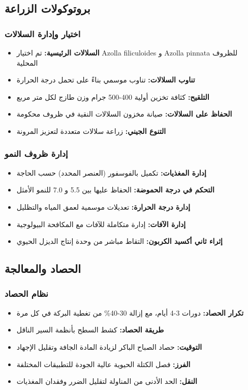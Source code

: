 \subsection{بروتوكولات الزراعة}

\subsubsection{اختيار وإدارة السلالات}
\begin{itemize}
    \item \textbf{السلالات الرئيسية:} تم اختيار Azolla filiculoides و Azolla pinnata للظروف المحلية
    \item \textbf{تناوب السلالات:} تناوب موسمي بناءً على تحمل درجة الحرارة
    \item \textbf{التلقيح:} كثافة تخزين أولية 400-500 جرام وزن طازج لكل متر مربع
    \item \textbf{الحفاظ على السلالات:} صيانة مخزون السلالات النقية في ظروف محكومة
    \item \textbf{التنوع الجيني:} زراعة سلالات متعددة لتعزيز المرونة
\end{itemize}

\subsubsection{إدارة ظروف النمو}
\begin{itemize}
    \item \textbf{إدارة المغذيات:} تكميل بالفوسفور (العنصر المحدد) حسب الحاجة
    \item \textbf{التحكم في درجة الحموضة:} الحفاظ عليها بين 5.5 و 7.0 للنمو الأمثل
    \item \textbf{إدارة درجة الحرارة:} تعديلات موسمية لعمق المياه والتظليل
    \item \textbf{إدارة الآفات:} إدارة متكاملة للآفات مع المكافحة البيولوجية
    \item \textbf{إثراء ثاني أكسيد الكربون:} التقاط مباشر من وحدة إنتاج الديزل الحيوي
\end{itemize}

\subsection{الحصاد والمعالجة}

\subsubsection{نظام الحصاد}
\begin{itemize}
    \item \textbf{تكرار الحصاد:} دورات 3-4 أيام، مع إزالة 30-40\% من تغطية البركة في كل مرة
    \item \textbf{طريقة الحصاد:} كشط السطح بأنظمة السير الناقل
    \item \textbf{التوقيت:} حصاد الصباح الباكر لزيادة المادة الجافة وتقليل الإجهاد
    \item \textbf{الفرز:} فصل الكتلة الحيوية عالية الجودة للتطبيقات المختلفة
    \item \textbf{النقل:} الحد الأدنى من المناولة لتقليل الضرر وفقدان المغذيات
\end{itemize}

